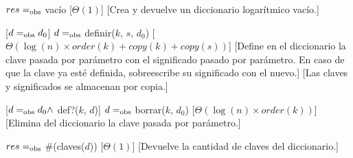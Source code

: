 \begin{Interfaz}
  
  \begin{paramFormales}
    \paramGeneros{$\kappa$, $\sigma$}




  \end{paramFormales}


  \generos{\tipo{\diccLogKS}}


    {$res =_{\mathrm{obs}}$ vac\'io}
    [$\Theta(1)$]
    [Crea y devuelve un diccionario logar\'itmico vac\'io.]

    [$d =_{\mathrm{obs}} d_0$]
    {$d =_{\mathrm{obs}}$ definir($k$, $s$, $d_0$)}
    [$\Theta(\log(n) \times order(k) + copy(k) + copy(s))$]
    [Define en el diccionario la clave pasada por par\'ametro con el significado pasado por par\'ametro. En caso de que la clave ya est\'e definida, sobreescribe su significado con el nuevo.]
    [Las claves y significados se almacenan por copia.]

    [$d =_{\mathrm{obs}} d_0 \land$ def?($k$, $d$)]
    {$d =_{\mathrm{obs}}$ borrar($k$, $d_0$)}
    [$\Theta(\log(n) \times order(k))$]
    [Elimina del diccionario la clave pasada por par\'ametro.]

    {$res =_{\mathrm{obs}}$ \#(claves($d$))}
    [$\Theta(1)$]
    [Devuelve la cantidad de claves del diccionario.]


\end{Interfaz}
